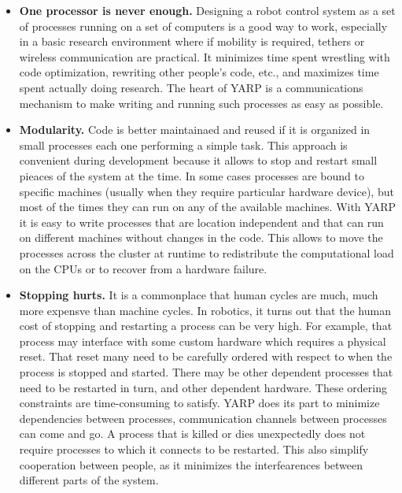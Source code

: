\begin{itemize} \pflist
\item {\bf One processor is never enough.}
%
Designing a robot control system as a set of processes running on a
set of computers is a good way to work, especially in a basic research
environment where if mobility is required, tethers or wireless
communication are practical.  It minimizes time spent wrestling with
code optimization, rewriting other people's code, etc., and maximizes
time spent actually doing research.  The heart of YARP is a
communications mechanism to make writing and running such processes as
easy as possible.

\item {\bf Modularity.}
Code is better maintainaed and reused if it is organized in small processes each one performing a simple task. This approach is convenient during development because it allows to stop and restart small pieaces of the system at the time. In some cases processes are bound to specific machines (usually when they require particular hardware device), but most of the times they can run on any of the available machines. With YARP it is easy to write processes that are location independent and that can run on different machines without changes in the code. This allows to move the processes across the cluster at runtime to redistribute the computational load on the CPUs or to recover from a hardware failure.

\item {\bf Stopping hurts.}
%
It is a commonplace that human cycles are much, much more expensve
than machine cycles.  In robotics, it turns out that the human
cost of stopping and restarting a process can be very high.
For example, that process may interface with some
custom hardware which requires a physical reset.  
That reset many need to be carefully ordered with respect to when the
process is stopped and started.
%
There may be other dependent processes that need to be restarted in
turn, and other dependent hardware.
%
These ordering constraints are time-consuming to satisfy.
%
YARP does its part to minimize dependencies between processes,
communication channels
between processes can come and go. A process that is killed or dies
unexpectedly does not require processes to which it connects to be
restarted. This also simplify cooperation between people, as
it minimizes the interfearences between different parts of the system.


\end{itemize}
